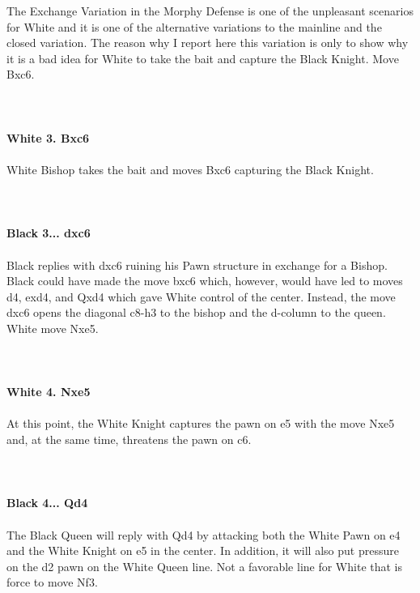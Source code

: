 \documentclass{article}
\begin{document}
The Exchange Variation in the Morphy Defense is one of the unpleasant scenarios for White and it is one of the alternative variations to the mainline and the closed variation. The reason why I report here this variation is only to show why it is a bad idea for White to take the bait and capture the Black Knight. Move Bxc6.\\
\\

\\
\\
\textbf{White 3. Bxc6}\\
\\
White Bishop takes the bait and moves Bxc6 capturing the Black Knight.\\
\\

\\
\\
\textbf{Black 3... dxc6}\\
\\
Black replies with dxc6 ruining his Pawn structure in exchange for a Bishop. Black could have made the move bxc6 which, however, would have led to moves d4, exd4, and Qxd4 which gave White control of the center. Instead, the move dxc6 opens the diagonal c8-h3 to the bishop and the d-column to the queen. White move Nxe5.\\
\\

\\
\\
\textbf{White 4. Nxe5}\\
\\
At this point, the White Knight captures the pawn on e5 with the move Nxe5 and, at the same time, threatens the pawn on c6.\\
\\

\\
\\
\textbf{Black 4... Qd4}\\
\\
The Black Queen will reply with Qd4 by attacking both the White Pawn on e4 and the White Knight on e5 in the center. In addition, it will also put pressure on the d2 pawn on the White Queen line. Not a favorable line for White that is force to move Nf3.\\
\\

\\
\end{document}
